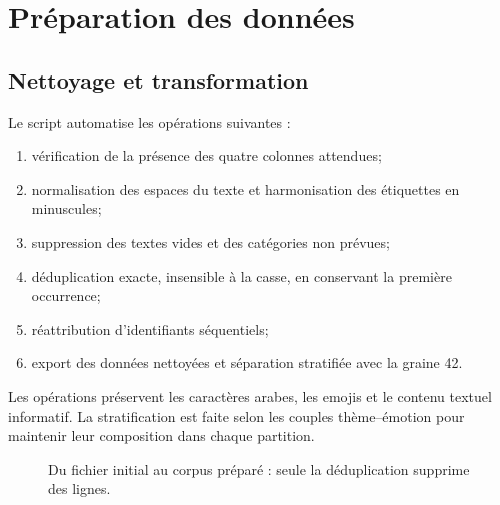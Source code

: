\documentclass[11pt,a4paper]{article}
\DeclareRobustCommand{\file}[1]{{\small\urlstyle{tt}\path{#1}}}
\begin{document}
\section{Préparation des données}
\subsection{Nettoyage et transformation}
Le script \file{nettoyage.py} automatise les opérations suivantes :
\begin{enumerate}
  \item vérification de la présence des quatre colonnes attendues;
  \item normalisation des espaces du texte et harmonisation des étiquettes en minuscules;
  \item suppression des textes vides et des catégories non prévues;
  \item déduplication exacte, insensible à la casse, en conservant la première occurrence;
  \item réattribution d'identifiants séquentiels;
  \item export des données nettoyées et séparation stratifiée avec la graine 42.
\end{enumerate}
Les opérations préservent les caractères arabes, les emojis et le contenu textuel informatif. La stratification est faite selon les couples thème--émotion pour maintenir leur composition dans chaque partition.

\begin{figure}[!ht]
\centering
{}
\caption{Du fichier initial au corpus préparé : seule la déduplication supprime des lignes.}
\end{figure}
\end{document}
